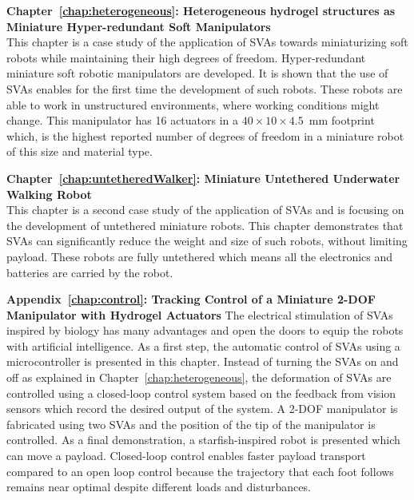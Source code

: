 \textbf{Chapter~\ref{chap:heterogeneous}: Heterogeneous hydrogel structures as Miniature Hyper-redundant Soft Manipulators}\\
This chapter is  a case study of the application of SVAs towards miniaturizing soft robots while maintaining their high degrees of freedom. Hyper-redundant miniature soft robotic manipulators are developed. It is shown that the use of SVAs enables for the first time the development of such robots. These robots are able to work in unstructured environments, where  working conditions might change. This manipulator has 16 actuators in a $40\times 10\times 4.5$~mm footprint which, is the highest reported number of degrees of freedom in a miniature robot of this size and material type.

\textbf{Chapter~\ref{chap:untetheredWalker}: Miniature Untethered Underwater Walking Robot}\\
This chapter is a second case study of the application of SVAs and is focusing on the development of untethered miniature robots. This chapter demonstrates that SVAs can significantly reduce the weight and size of such robots, without limiting payload. These robots are fully untethered which means all the electronics and batteries are carried by the robot. 

\textbf{Appendix~\ref{chap:control}: Tracking Control of a Miniature 2-DOF Manipulator with Hydrogel Actuators}
The electrical stimulation of SVAs inspired by biology has many advantages and open the doors to equip the robots with artificial intelligence. As a first step, the automatic control of SVAs using a microcontroller is presented in this chapter. Instead of turning the SVAs on and off as explained in Chapter~\ref{chap:heterogeneous}, the deformation of SVAs are controlled using a closed-loop control system based on the feedback from vision sensors which record the desired output of the system. A 2-DOF manipulator is fabricated using two SVAs and the position of the tip of the manipulator is controlled. As a final demonstration, a starfish-inspired robot is presented which can move a payload. Closed-loop control enables faster payload transport compared to an open loop control because the trajectory that each foot follows remains near optimal despite different loads and disturbances. 

